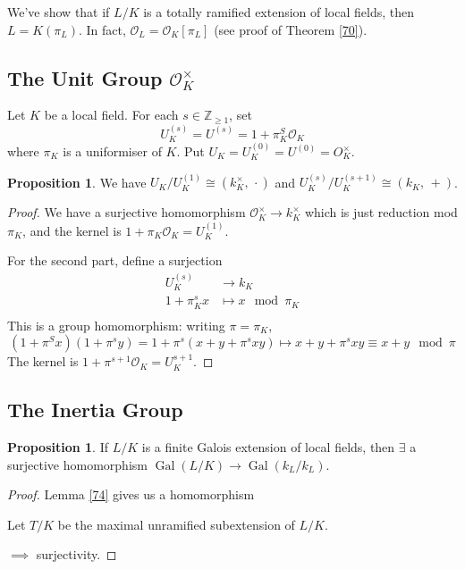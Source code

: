 \documentclass[a4paper]{article}
\theoremstyle{definition}
\theoremstyle{default}
\newtheorem{prop}[definition]{Proposition}
\theoremstyle{remark}
\DeclareMathOperator{\Aut}{Aut}
\DeclareMathOperator{\Gal}{Gal}
\begin{document}
We've show that if $L/K$ is a totally ramified extension of local fields, then $L=K(\pi_L)$.
In fact, $\mathcal{O}_L = \mathcal{O}_K[\pi_L]$ (see proof of Theorem \ref{70}).

\subsection{The Unit Group $\mathcal{O}_K^\times$}
Let $K$ be a local field.
For each $s \in \mathbb{Z}_{\geq 1}$, set
$$U_K^{(s)} = U^{(s)} = 1 + \pi_K^S \mathcal{O}_K$$
where $\pi_K$ is a uniformiser of $K$.
Put $U_K = U_K^{(0)} = U^{(0)} = O_K^\times$.

\begin{prop}
	We have $U_K/U_K^{(1)} \cong (k_K^\times,\, \cdot)$
	and $U_K^{(s)}/U_K^{(s+1)} \cong (k_K,\, +)$.
\end{prop}
\begin{proof}
	We have a surjective homomorphism $\mathcal{O}_K^\times \to k_K^\times$ which is just reduction mod $\pi_K$,
	and the kernel is $1 + \pi_K\mathcal{O}_K = U_K^{(1)}$.
	
	For the second part, define a surjection
	\begin{align*}
		U_K^{(s)} &\to k_K \\
		1 + \pi_K^sx &\mapsto x \mod \pi_K \\
	\end{align*}
	This is a group homomorphism: writing $\pi = \pi_K$,
	$$(1 + \pi^Sx)(1+\pi^sy) = 1+\pi^s(x + y + \pi^sxy) \mapsto x+y+\pi^sxy \equiv x+y \mod \pi$$
	The kernel is $1+\pi^{s+1}\mathcal{O}_K = U_K^{s+1}$.
\end{proof}

\subsection{The Inertia Group}
\begin{prop}
	If $L/K$ is a finite Galois extension of local fields,
	then $\exists$ a surjective homomorphism $\Gal(L/K) \to \Gal(k_L/k_L)$.
	\label{80}
\end{prop}
\begin{proof}
	Lemma \ref{74} gives us a homomorphism
	\begin{center}
	\end{center}
	
	Let $T/K$ be the maximal unramified subextension of $L/K$.
	\begin{center}
	\end{center}
	
	$\implies$ surjectivity.
\end{proof}
\end{document}
